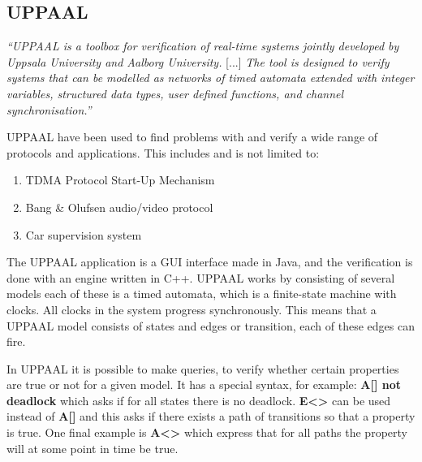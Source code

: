 \subsection{UPPAAL}\label{subsec:uppaal}
\begin{tcolorbox}[floatplacement=b,float,colback=white!5,colframe=aaublue!50,title=What is UPPAAL \cite{tutorial04}?]
\textit{``UPPAAL is a toolbox for verification of real-time systems jointly developed by Uppsala University and Aalborg University.} [...] \textit{The tool is designed to verify systems that can be modelled as networks of timed automata extended with integer variables, structured data types, user defined functions, and channel synchronisation.''}
\end{tcolorbox} 

UPPAAL have been used to find problems with and verify a wide range of protocols and applications. 
This includes and is not limited to: 
\begin{enumerate}[label=\itshape \alph*\upshape)]
    \item TDMA Protocol Start-Up Mechanism \cite{Lonn:1997:FVT:826040.827011}
    \item Bang \& Olufsen audio/video protocol \cite{Havelund97formalmodeling}
    \item Car supervision system \cite{gebremichael2004formal}
\end{enumerate}
The UPPAAL application is a GUI interface made in Java, and the verification is done with an engine written in C++. 
UPPAAL works by consisting of several models each of these is a timed automata, which is a finite-state machine with clocks. 
All clocks in the system progress synchronously. 
This means that a UPPAAL model consists of states and edges or transition, each of these edges can fire. 

In UPPAAL it is possible to make queries, to verify whether certain properties are true or not for a given model.
It has a special syntax, for example: \textbf{A[] not deadlock} which asks if for all states there is no deadlock.
\textbf{E<>} can be used instead of \textbf{A[]} and this asks if there exists a path of transitions so that a property is true.
One final example is \textbf{A<>} which express that for all paths the property will at some point in time be true.

